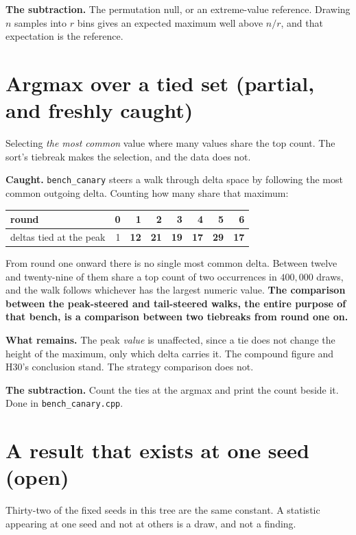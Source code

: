 \textbf{The subtraction.} The permutation null, or an extreme-value reference. Drawing \(n\) samples into \(r\) bins gives an expected maximum well above \(n/r\), and that expectation is the reference.

\section{Argmax over a tied set (partial, and freshly caught)}

Selecting \emph{the most common} value where many values share the top count. The sort's tiebreak makes the selection, and the data does not.

\textbf{Caught.} \texttt{bench\_canary} steers a walk through delta space by following the most common outgoing delta. Counting how many share that maximum:

\begin{center}
\begin{tabular}{@{}lrrrrrrr@{}}
\toprule
round & 0 & 1 & 2 & 3 & 4 & 5 & 6 \\
\midrule
deltas tied at the peak & 1 & \textbf{12} & \textbf{21} & \textbf{19} & \textbf{17} & \textbf{29} & \textbf{17} \\
\bottomrule
\end{tabular}
\end{center}

From round one onward there is no single most common delta. Between twelve and twenty-nine of them share a top count of two occurrences in \(400{,}000\) draws, and the walk follows whichever has the largest numeric value. \textbf{The comparison between the peak-steered and tail-steered walks, the entire purpose of that bench, is a comparison between two tiebreaks from round one on.}

\textbf{What remains.} The peak \emph{value} is unaffected, since a tie does not change the height of the maximum, only which delta carries it. The compound figure and H30's conclusion stand. The strategy comparison does not.

\textbf{The subtraction.} Count the ties at the argmax and print the count beside it. Done in \texttt{bench\_canary.cpp}.

\section{A result that exists at one seed (open)}

Thirty-two of the fixed seeds in this tree are the same constant. A statistic appearing at one seed and not at others is a draw, and not a finding.

